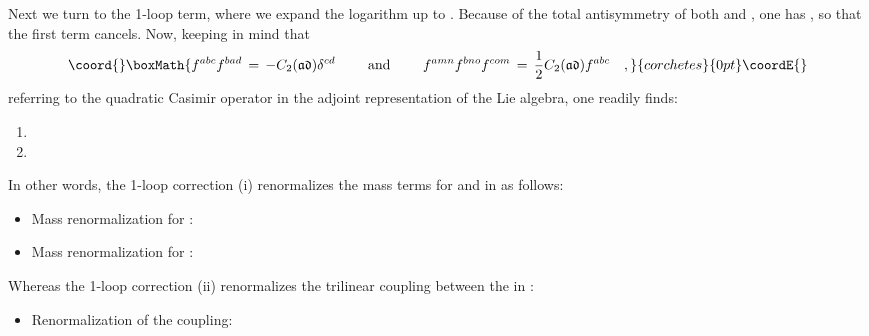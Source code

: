 \documentclass[a4paper,11pt]{article}
\begin{document}
Next we turn to the 1-loop term, where we expand the logarithm up to \coordHE{}.
Because of the total antisymmetry of both \coordHE{} and \coordHE{}, one has \coordHE{}, so that
the first term cancels. 
Now, keeping in mind that 
\[\coord{}\boxMath{
f^{abc}f^{bad}\,=\,-C_{2}(\mathfrak{ad})\delta ^{cd}\text{ \qquad and \qquad }
f^{amn}f^{bno}f^{com}\,=\,\frac{1}{2}C_{2}(\mathfrak{ad})f^{abc}\quad ,
}{corchetes}{0pt}\coordE{}\]
\coordHE{} referring to the quadratic Casimir operator in the adjoint representation of the Lie algebra,
one readily finds:
\renewcommand{\theenumi}{(\roman{enumi})}
\begin{enumerate}
\item  {}\coordHE{} 
\item  {}\coordHE{}
\end{enumerate}
In other words, the 1-loop correction (i) renormalizes the mass terms
for \coordHE{} and \myHighlight{$\phi $}\coordHE{} in \coordHE{} as follows:
\begin{itemize}
\item  Mass renormalization for \coordHE{}: \coordHE{}
\item  Mass renormalization for \myHighlight{$\phi $}\coordHE{}: \coordHE{}
\end{itemize}
Whereas the 1-loop correction (ii) renormalizes the trilinear coupling
between the \coordHE{} in \coordHE{}:
\begin{itemize}
\item  Renormalization of the \coordHE{} coupling: \coordHE{}
\end{itemize}
\end{document}
